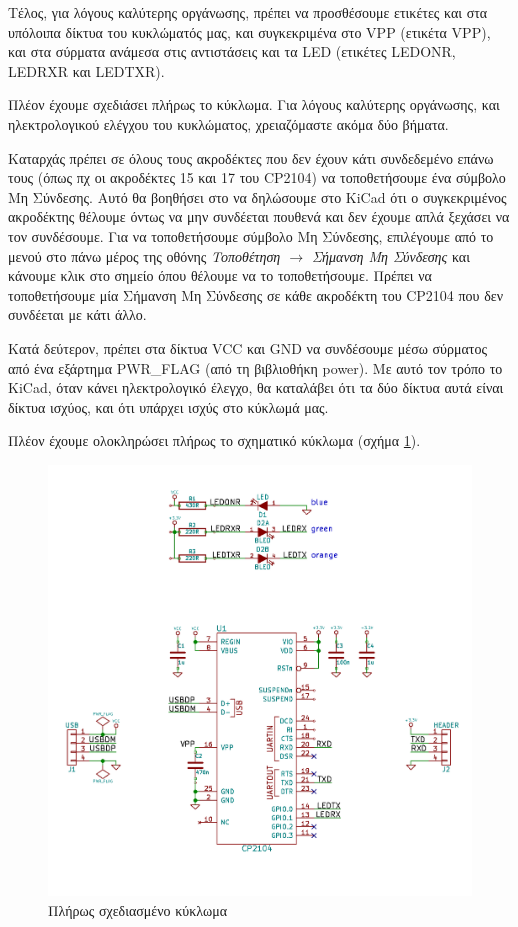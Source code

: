 \documentclass[a4paper]{article}
\begin{document}
Τέλος, για λόγους καλύτερης οργάνωσης, πρέπει να προσθέσουμε ετικέτες και στα υπόλοιπα δίκτυα του κυκλώματός μας, και συγκεκριμένα στο VPP (ετικέτα VPP), και στα σύρματα ανάμεσα στις αντιστάσεις και τα LED (ετικέτες LEDONR, LEDRXR και LEDTXR).

Πλέον έχουμε σχεδιάσει πλήρως το κύκλωμα. Για λόγους καλύτερης οργάνωσης, και ηλεκτρολογικού ελέγχου του κυκλώματος, χρειαζόμαστε ακόμα δύο βήματα.

Καταρχάς πρέπει σε όλους τους ακροδέκτες που δεν έχουν κάτι συνδεδεμένο επάνω τους (όπως πχ οι ακροδέκτες 15 και 17 του CP2104) να τοποθετήσουμε ένα σύμβολο Μη Σύνδεσης. Αυτό θα βοηθήσει στο να δηλώσουμε στο \textenglish{KiCad} ότι ο συγκεκριμένος ακροδέκτης θέλουμε όντως να μην συνδέεται πουθενά και δεν έχουμε απλά ξεχάσει να τον συνδέσουμε. Για να τοποθετήσουμε σύμβολο Μη Σύνδεσης, επιλέγουμε από το μενού στο πάνω μέρος της οθόνης \textit{Τοποθέτηση $\rightarrow$ Σήμανση Μη Σύνδεσης} και κάνουμε κλικ στο σημείο όπου θέλουμε να το τοποθετήσουμε. Πρέπει να τοποθετήσουμε μία Σήμανση Μη Σύνδεσης σε κάθε ακροδέκτη του CP2104 που δεν συνδέεται με κάτι άλλο.

Κατά δεύτερον, πρέπει στα δίκτυα VCC και GND να συνδέσουμε μέσω σύρματος από ένα εξάρτημα PWR\_FLAG (από τη βιβλιοθήκη power). Με αυτό τον τρόπο το \textenglish{KiCad}, όταν κάνει ηλεκτρολογικό έλεγχο, θα καταλάβει ότι τα δύο δίκτυα αυτά είναι δίκτυα ισχύος, και ότι υπάρχει ισχύς στο κύκλωμά μας.

Πλέον έχουμε ολοκληρώσει πλήρως το σχηματικό κύκλωμα (σχήμα \ref{fig:eesch-schem-final2}).

\begin{figure}
  \begin{center}
    \includegraphics[width=.9\textwidth]{img/eesch-schem-final.png}
    \caption{Πλήρως σχεδιασμένο κύκλωμα}
    \label{fig:eesch-schem-final2}
  \end{center}
\end{figure}
\end{document}
